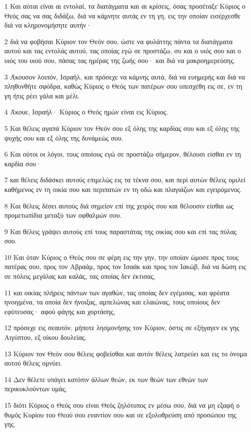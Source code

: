 \par 1 Και αύται είναι αι εντολαί, τα διατάγματα και αι κρίσεις, όσας προσέταξε Κύριος ο Θεός σας να σας διδάξω, διά να κάμνητε αυτάς εν τη γη, εις την οποίαν εισέρχεσθε διά να κληρονομήσητε αυτήν·
\par 2 διά να φοβήσαι Κύριον τον Θεόν σου, ώστε να φυλάττης πάντα τα διατάγματα αυτού και τας εντολάς αυτού, τας οποίας εγώ σε προστάζω, συ και ο υιός σου και ο υιός του υιού σου, πάσας τας ημέρας της ζωής σου· και διά να μακροημερεύσης.
\par 3 Άκουσον λοιπόν, Ισραήλ, και πρόσεχε να κάμνης αυτά, διά να ευημερής και διά να πληθυνθήτε σφόδρα, καθώς Κύριος ο Θεός των πατέρων σου υπεσχέθη εις σε, εν τη γη ήτις ρέει γάλα και μέλι.
\par 4 Άκουε, Ισραήλ· Κύριος ο Θεός ημών είναι εις Κύριος.
\par 5 Και θέλεις αγαπά Κύριον τον Θεόν σου εξ όλης της καρδίας σου και εξ όλης της ψυχής σου και εξ όλης της δυνάμεώς σου.
\par 6 Και ούτοι οι λόγοι, τους οποίους εγώ σε προστάζω σήμερον, θέλουσι είσθαι εν τη καρδία σου·
\par 7 και θέλεις διδάσκει αυτούς επιμελώς εις τα τέκνα σου, και περί αυτών θέλεις ομιλεί καθήμενος εν τη οικία σου και περιπατών εν τη οδώ και πλαγιάζων και εγειρόμενος.
\par 8 Και θέλεις δέσει αυτούς διά σημείον επί της χειρός σου και θέλουσιν είσθαι ως προμετωπίδια μεταξύ των οφθαλμών σου.
\par 9 Και θέλεις γράψει αυτούς επί τους παραστάτας της οικίας σου και επί τας πύλας σου.
\par 10 Και όταν Κύριος ο Θεός σου σε φέρη εις την γην, την οποίαν ώμοσε προς τους πατέρας σου, προς τον Αβραάμ, προς τον Ισαάκ και προς τον Ιακώβ, διά να δώση εις σε πόλεις μεγάλας και καλάς, τας οποίας δεν έκτισας,
\par 11 και οικίας πλήρεις πάντων των αγαθών, τας οποίας δεν εγέμισας, και φρέατα ηνοιγμένα, τα οποία δεν ήνοιξας, αμπελώνας και ελαιώνας, τους οποίους δεν εφύτευσας· αφού φάγης και χορτάσης,
\par 12 πρόσεχε εις σεαυτόν, μήποτε λησμονήσης τον Κύριον, όστις σε εξήγαγεν εκ γης Αιγύπτου, εξ οίκου δουλείας.
\par 13 Κύριον τον Θεόν σου θέλεις φοβείσθαι και αυτόν θέλεις λατρεύει και εις το όνομα αυτού θέλεις ομνύει.
\par 14 Δεν θέλετε υπάγει κατόπιν άλλων θεών, εκ των θεών των εθνών των περικυκλούντων υμάς,
\par 15 διότι Κύριος ο Θεός σου είναι Θεός ζηλότυπος εν μέσω σου, διά να μη εξαφή ο θυμός Κυρίου του Θεού σου εναντίον σου και σε εξολοθρεύση από προσώπου της γης.

